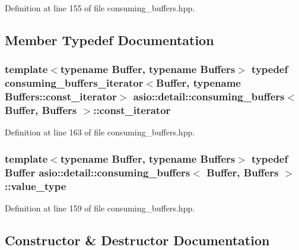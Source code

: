 Definition at line 155 of file consuming\+\_\+buffers.\+hpp.



\subsection{Member Typedef Documentation}
\hypertarget{classasio_1_1detail_1_1consuming__buffers_a0abc4cc4aed2717a1de4b38d78f3d525}{}
\subsubsection[{const\+\_\+iterator}]{\setlength{\rightskip}{0pt plus 5cm}template$<$typename Buffer, typename Buffers$>$ typedef {\bf consuming\+\_\+buffers\+\_\+iterator}$<$Buffer, typename Buffers\+::const\+\_\+iterator$>$ {\bf asio\+::detail\+::consuming\+\_\+buffers}$<$ Buffer, Buffers $>$\+::{\bf const\+\_\+iterator}}\label{classasio_1_1detail_1_1consuming__buffers_a0abc4cc4aed2717a1de4b38d78f3d525}


Definition at line 163 of file consuming\+\_\+buffers.\+hpp.

\hypertarget{classasio_1_1detail_1_1consuming__buffers_a3063fd648bf703fb9c861db934f61ed5}{}
\subsubsection[{value\+\_\+type}]{\setlength{\rightskip}{0pt plus 5cm}template$<$typename Buffer, typename Buffers$>$ typedef Buffer {\bf asio\+::detail\+::consuming\+\_\+buffers}$<$ Buffer, Buffers $>$\+::{\bf value\+\_\+type}}\label{classasio_1_1detail_1_1consuming__buffers_a3063fd648bf703fb9c861db934f61ed5}


Definition at line 159 of file consuming\+\_\+buffers.\+hpp.



\subsection{Constructor \& Destructor Documentation}
\hypertarget{classasio_1_1detail_1_1consuming__buffers_a341db3b10600a97331d79989a0fce056}{}
